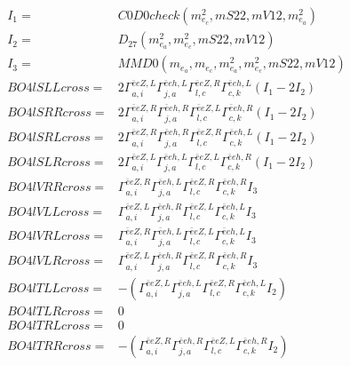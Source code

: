 \documentclass[A4,landscape]{article}
\begin{document}
\begin{align} 
I_1 = & C0D0check(m^2_{e_{{c}}}, mS22, mV12, m^2_{e_{{a}}}) \\ 
I_2 = & D_{27}(m^2_{e_{{a}}}, m^2_{e_{{c}}}, mS22, mV12) \\ 
I_3 = & MMD0(m_{e_{{a}}}, m_{e_{{c}}}, m^2_{e_{{a}}}, m^2_{e_{{c}}}, mS22, mV12) \\ 
  BO4lSLLcross= & 2  \Gamma^{\bar{e}e Z ,L}_{a, i} \Gamma^{\bar{e}e h ,L}_{j, a} \Gamma^{\bar{e}e Z ,R}_{l, c} \Gamma^{\bar{e}e h ,L}_{c, k} (I_1 - 2 I_2) \\ 
  BO4lSRRcross= & 2  \Gamma^{\bar{e}e Z ,R}_{a, i} \Gamma^{\bar{e}e h ,R}_{j, a} \Gamma^{\bar{e}e Z ,L}_{l, c} \Gamma^{\bar{e}e h ,R}_{c, k} (I_1 - 2 I_2) \\ 
  BO4lSRLcross= & 2  \Gamma^{\bar{e}e Z ,R}_{a, i} \Gamma^{\bar{e}e h ,R}_{j, a} \Gamma^{\bar{e}e Z ,R}_{l, c} \Gamma^{\bar{e}e h ,L}_{c, k} (I_1 - 2 I_2) \\ 
  BO4lSLRcross= & 2  \Gamma^{\bar{e}e Z ,L}_{a, i} \Gamma^{\bar{e}e h ,L}_{j, a} \Gamma^{\bar{e}e Z ,L}_{l, c} \Gamma^{\bar{e}e h ,R}_{c, k} (I_1 - 2 I_2) \\ 
  BO4lVRRcross= &  \Gamma^{\bar{e}e Z ,R}_{a, i} \Gamma^{\bar{e}e h ,L}_{j, a} \Gamma^{\bar{e}e Z ,R}_{l, c} \Gamma^{\bar{e}e h ,R}_{c, k} I_3 \\ 
  BO4lVLLcross= &  \Gamma^{\bar{e}e Z ,L}_{a, i} \Gamma^{\bar{e}e h ,R}_{j, a} \Gamma^{\bar{e}e Z ,L}_{l, c} \Gamma^{\bar{e}e h ,L}_{c, k} I_3 \\ 
  BO4lVRLcross= &  \Gamma^{\bar{e}e Z ,R}_{a, i} \Gamma^{\bar{e}e h ,L}_{j, a} \Gamma^{\bar{e}e Z ,L}_{l, c} \Gamma^{\bar{e}e h ,L}_{c, k} I_3 \\ 
  BO4lVLRcross= &  \Gamma^{\bar{e}e Z ,L}_{a, i} \Gamma^{\bar{e}e h ,R}_{j, a} \Gamma^{\bar{e}e Z ,R}_{l, c} \Gamma^{\bar{e}e h ,R}_{c, k} I_3 \\ 
  BO4lTLLcross= & -( \Gamma^{\bar{e}e Z ,L}_{a, i} \Gamma^{\bar{e}e h ,L}_{j, a} \Gamma^{\bar{e}e Z ,R}_{l, c} \Gamma^{\bar{e}e h ,L}_{c, k} I_2) \\ 
  BO4lTLRcross= & 0 \\ 
  BO4lTRLcross= & 0 \\ 
  BO4lTRRcross= & -( \Gamma^{\bar{e}e Z ,R}_{a, i} \Gamma^{\bar{e}e h ,R}_{j, a} \Gamma^{\bar{e}e Z ,L}_{l, c} \Gamma^{\bar{e}e h ,R}_{c, k} I_2) \\ 
\end{align} 
\end{document}
